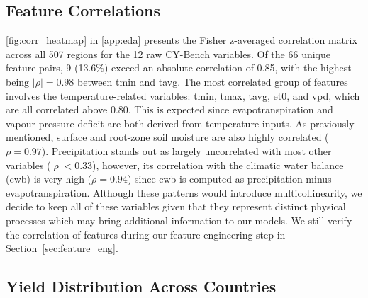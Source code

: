 \documentclass[pdflatex,sn-mathphys-num, oneside, 11pt]{sn-jnl}%
\theoremstyle{thmstyleone}%
\theoremstyle{thmstyletwo}%
\theoremstyle{thmstylethree}%
\begin{document}
\subsection{Feature Correlations}

\autoref{fig:corr_heatmap} in \autoref{app:eda} presents the Fisher z-averaged correlation matrix across all 507 regions for the 12 raw CY-Bench variables. Of the 66 unique feature pairs, 9 (13.6\%) exceed an absolute correlation of 0.85, with the highest being $|\rho| = 0.98$ between tmin and tavg. The most correlated group of features involves the temperature-related variables: tmin, tmax, tavg, et0, and vpd, which are all correlated above 0.80. This is expected since evapotranspiration and vapour pressure deficit are both derived from temperature inputs. As previously mentioned, surface and root-zone soil moisture are also highly correlated ($\rho = 0.97$). Precipitation stands out as largely uncorrelated with most other variables ($|\rho| < 0.33$), however, its correlation with the climatic water balance (cwb) is very high ($\rho = 0.94$) since cwb is computed as precipitation minus evapotranspiration. Although these patterns would introduce multicollinearity, we decide to keep all of these variables given that they represent distinct physical processes which may bring additional information to our models. We still verify the correlation of features during our feature engineering step in Section~\ref{sec:feature_eng}.

\subsection{Yield Distribution Across Countries}
\end{document}
